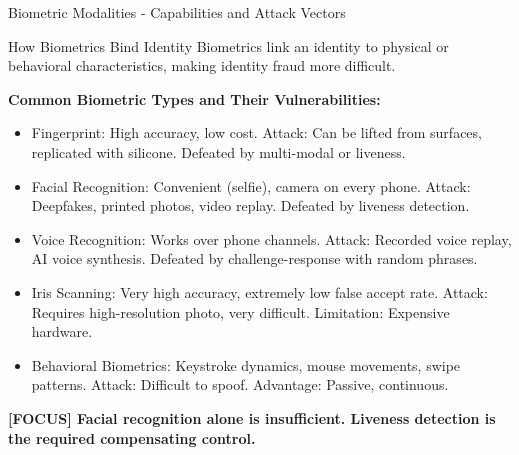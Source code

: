 \documentclass[11pt,a4paper]{beamer}
\newcommand{\examfocus}[1]{\textcolor{orange!80!black}{\textbf{[FOCUS] #1}}}
\begin{document}
	\begin{frame}{Biometric Modalities - Capabilities and Attack Vectors}
		\begin{block}{How Biometrics Bind Identity}
			Biometrics link an identity to physical or behavioral characteristics, making identity fraud more difficult.
		\end{block}
		
		\textbf{Common Biometric Types and Their Vulnerabilities:}
		\begin{itemize}
			\item Fingerprint: High accuracy, low cost. Attack: Can be lifted from surfaces, replicated with silicone. Defeated by multi-modal or liveness.
			\item Facial Recognition: Convenient (selfie), camera on every phone. Attack: Deepfakes, printed photos, video replay. Defeated by liveness detection.
			\item Voice Recognition: Works over phone channels. Attack: Recorded voice replay, AI voice synthesis. Defeated by challenge-response with random phrases.
			\item Iris Scanning: Very high accuracy, extremely low false accept rate. Attack: Requires high-resolution photo, very difficult. Limitation: Expensive hardware.
			\item Behavioral Biometrics: Keystroke dynamics, mouse movements, swipe patterns. Attack: Difficult to spoof. Advantage: Passive, continuous.
		\end{itemize}
		
		\examfocus{Facial recognition alone is insufficient. Liveness detection is the required compensating control.}
	\end{frame}
	
\end{document}
